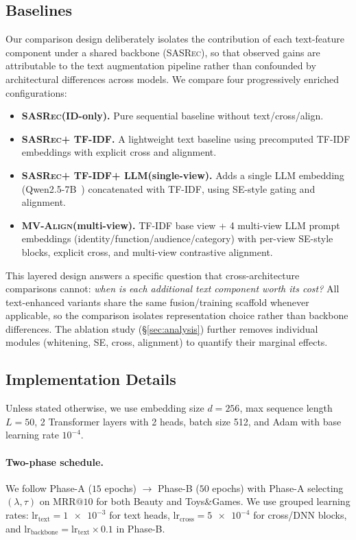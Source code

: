 \documentclass[sigconf,natbib=true,anonymous]{acmart}
\newcommand{\model}{\textsc{MV-Align}\xspace}
\newcommand{\base}{\textsc{SASRec}\xspace}
\newcommand{\tfidf}{\textsc{TF-IDF}\xspace}
\newcommand{\llm}{\textsc{LLM}\xspace}
\newcommand{\slashbreak}{/\allowbreak{}}
\begin{document}
\subsection{Baselines}
Our comparison design deliberately isolates the contribution of each
text-feature component under a shared backbone (\base), so that
observed gains are attributable to the text augmentation pipeline
rather than confounded by architectural differences across models.
We compare four progressively enriched configurations:
\begin{itemize}[leftmargin=*,itemsep=2pt]
  \item \textbf{\base (ID-only).} Pure sequential baseline
    without text\slashbreak{}cross\slashbreak{}align.
  \item \textbf{\base + \tfidf.} A lightweight text baseline
    using precomputed \tfidf embeddings with explicit cross
    and alignment.
  \item \textbf{\base + \tfidf + \llm (single-view).} Adds a
    single \llm embedding (Qwen2.5-7B~\cite{qwen2024qwen25}) concatenated with
    \tfidf, using SE-style gating and alignment.
  \item \textbf{\model (multi-view).} \tfidf base view + 4
    multi-view \llm prompt embeddings
    (identity\slashbreak{}function\slashbreak{}audience\slashbreak{}category) with per-view SE-style blocks,
    explicit cross, and multi-view contrastive alignment.
\end{itemize}
\noindent This layered design answers a specific question that
cross-architecture comparisons cannot: \emph{when is each additional
text component worth its cost?}
All text-enhanced variants share the same fusion/training scaffold
whenever applicable, so the comparison isolates representation choice
rather than backbone differences.
The ablation study
(\S\ref{sec:analysis}) further removes individual modules
(whitening, SE, cross, alignment) to quantify their marginal effects.

\subsection{Implementation Details}
Unless stated otherwise, we use embedding size $d=256$, max
sequence length $L=50$, 2 Transformer layers with 2 heads,
batch size 512, and Adam with base learning rate $10^{-4}$.
\paragraph{Two-phase schedule.}
We follow Phase-A ($15$ epochs) $\rightarrow$ Phase-B ($50$
epochs) with Phase-A selecting $(\lambda,\tau)$ on
$\mathrm{MRR@10}$ for both Beauty and Toys\&Games.
We use grouped learning rates:
$\text{lr}_{\text{text}}=\num{1e-3}$ for text heads,
$\text{lr}_{\text{cross}}=\num{5e-4}$ for cross/DNN blocks,
and $\text{lr}_{\text{backbone}}=\text{lr}_{\text{text}}\times
0.1$ in Phase-B.
\end{document}
